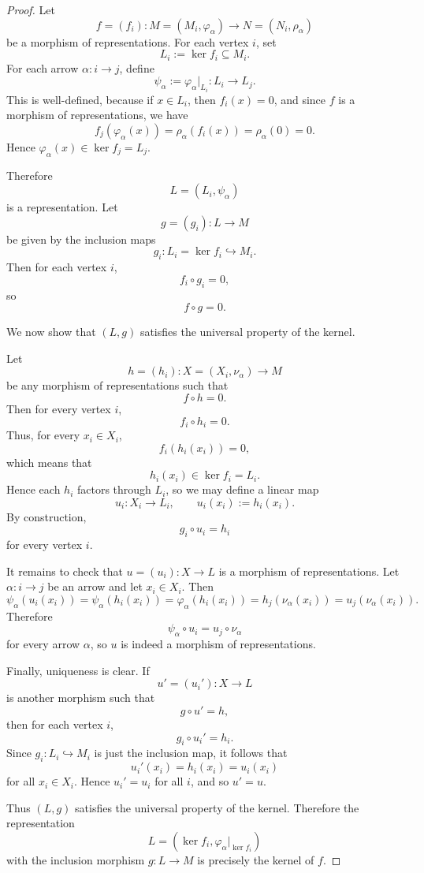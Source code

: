 \documentclass[11pt, a4paper]{report}
\begin{document}
\begin{proof}
    Let
    \[
    f=(f_i):M=(M_i,\varphi_\alpha)\longrightarrow N=(N_i,\rho_\alpha)
    \]
    be a morphism of representations. For each vertex $i$, set
    \[
    L_i:=\ker f_i \subseteq M_i.
    \]
    For each arrow $\alpha:i\to j$, define
    \[
    \psi_\alpha:=\varphi_\alpha|_{L_i}:L_i\to L_j.
    \]
    This is well-defined, because if $x\in L_i$, then $f_i(x)=0$, and since $f$ is a morphism of representations, we have
    \[
    f_j(\varphi_\alpha(x))
    =\rho_\alpha(f_i(x))
    =\rho_\alpha(0)
    =0.
    \]
    Hence $\varphi_\alpha(x)\in \ker f_j=L_j$.
    
    Therefore
    \[
    L=(L_i,\psi_\alpha)
    \]
    is a representation. Let
    \[
    g=(g_i):L\to M
    \]
    be given by the inclusion maps
    \[
    g_i:L_i=\ker f_i \hookrightarrow M_i.
    \]
    Then for each vertex $i$,
    \[
    f_i\circ g_i=0,
    \]
    so
    \[
    f\circ g=0.
    \]
    
    We now show that $(L,g)$ satisfies the universal property of the kernel.
    
    Let
    \[
    h=(h_i):X=(X_i,\nu_\alpha)\to M
    \]
    be any morphism of representations such that
    \[
    f\circ h=0.
    \]
    Then for every vertex $i$,
    \[
    f_i\circ h_i=0.
    \]
    Thus, for every $x_i\in X_i$,
    \[
    f_i(h_i(x_i))=0,
    \]
    which means that
    \[
    h_i(x_i)\in \ker f_i=L_i.
    \]
    Hence each $h_i$ factors through $L_i$, so we may define a linear map
    \[
    u_i:X_i\to L_i,\qquad u_i(x_i):=h_i(x_i).
    \]
    By construction,
    \[
    g_i\circ u_i=h_i
    \]
    for every vertex $i$.
    
    It remains to check that $u=(u_i):X\to L$ is a morphism of representations. Let $\alpha:i\to j$ be an arrow and let $x_i\in X_i$. Then
    \[
    \psi_\alpha(u_i(x_i))
    =\psi_\alpha(h_i(x_i))
    =\varphi_\alpha(h_i(x_i))
    =h_j(\nu_\alpha(x_i))
    =u_j(\nu_\alpha(x_i)).
    \]
    Therefore
    \[
    \psi_\alpha\circ u_i=u_j\circ \nu_\alpha
    \]
    for every arrow $\alpha$, so $u$ is indeed a morphism of representations.
    
    Finally, uniqueness is clear. If
    \[
    u'=(u_i'):X\to L
    \]
    is another morphism such that
    \[
    g\circ u'=h,
    \]
    then for each vertex $i$,
    \[
    g_i\circ u_i'=h_i.
    \]
    Since $g_i:L_i\hookrightarrow M_i$ is just the inclusion map, it follows that
    \[
    u_i'(x_i)=h_i(x_i)=u_i(x_i)
    \]
    for all $x_i\in X_i$. Hence $u_i'=u_i$ for all $i$, and so $u'=u$.
    
    Thus $(L,g)$ satisfies the universal property of the kernel. Therefore the representation
    \[
    L=(\ker f_i,\varphi_\alpha|_{\ker f_i})
    \]
    with the inclusion morphism $g:L\to M$ is precisely the kernel of $f$.
    \end{proof}
\end{document}
